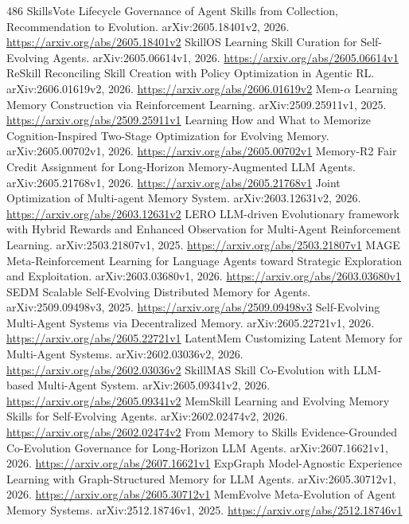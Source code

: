 \documentclass[11pt]{article}
\begin{document}
\begin{thebibliography}{486}
 SkillsVote Lifecycle Governance of Agent Skills from Collection, Recommendation to Evolution. arXiv:2605.18401v2, 2026. \url{https://arxiv.org/abs/2605.18401v2}
 SkillOS Learning Skill Curation for Self-Evolving Agents. arXiv:2605.06614v1, 2026. \url{https://arxiv.org/abs/2605.06614v1}
 ReSkill Reconciling Skill Creation with Policy Optimization in Agentic RL. arXiv:2606.01619v2, 2026. \url{https://arxiv.org/abs/2606.01619v2}
 Mem-$\alpha$ Learning Memory Construction via Reinforcement Learning. arXiv:2509.25911v1, 2025. \url{https://arxiv.org/abs/2509.25911v1}
 Learning How and What to Memorize Cognition-Inspired Two-Stage Optimization for Evolving Memory. arXiv:2605.00702v1, 2026. \url{https://arxiv.org/abs/2605.00702v1}
 Memory-R2 Fair Credit Assignment for Long-Horizon Memory-Augmented LLM Agents. arXiv:2605.21768v1, 2026. \url{https://arxiv.org/abs/2605.21768v1}
 Joint Optimization of Multi-agent Memory System. arXiv:2603.12631v2, 2026. \url{https://arxiv.org/abs/2603.12631v2}
 LERO LLM-driven Evolutionary framework with Hybrid Rewards and Enhanced Observation for Multi-Agent Reinforcement Learning. arXiv:2503.21807v1, 2025. \url{https://arxiv.org/abs/2503.21807v1}
 MAGE Meta-Reinforcement Learning for Language Agents toward Strategic Exploration and Exploitation. arXiv:2603.03680v1, 2026. \url{https://arxiv.org/abs/2603.03680v1}
 SEDM Scalable Self-Evolving Distributed Memory for Agents. arXiv:2509.09498v3, 2025. \url{https://arxiv.org/abs/2509.09498v3}
 Self-Evolving Multi-Agent Systems via Decentralized Memory. arXiv:2605.22721v1, 2026. \url{https://arxiv.org/abs/2605.22721v1}
 LatentMem Customizing Latent Memory for Multi-Agent Systems. arXiv:2602.03036v2, 2026. \url{https://arxiv.org/abs/2602.03036v2}
 SkillMAS Skill Co-Evolution with LLM-based Multi-Agent System. arXiv:2605.09341v2, 2026. \url{https://arxiv.org/abs/2605.09341v2}
 MemSkill Learning and Evolving Memory Skills for Self-Evolving Agents. arXiv:2602.02474v2, 2026. \url{https://arxiv.org/abs/2602.02474v2}
 From Memory to Skills Evidence-Grounded Co-Evolution Governance for Long-Horizon LLM Agents. arXiv:2607.16621v1, 2026. \url{https://arxiv.org/abs/2607.16621v1}
 ExpGraph Model-Agnostic Experience Learning with Graph-Structured Memory for LLM Agents. arXiv:2605.30712v1, 2026. \url{https://arxiv.org/abs/2605.30712v1}
 MemEvolve Meta-Evolution of Agent Memory Systems. arXiv:2512.18746v1, 2025. \url{https://arxiv.org/abs/2512.18746v1}

\end{thebibliography}
\end{document}
